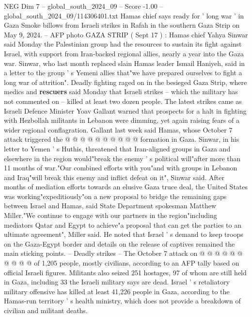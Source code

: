 \begin{textsample}{NEG Dim 7 – global\_south\_2024\_09 – Score -1.00 – global\_south\_2024\_09/114306401.txt}  \label{ex:f7_neg_221}
Hamas chief says ready for ' long war ' in Gaza Smoke billows from Israeli strikes in Rafah in the southern Gaza Strip on May 9, 2024. -- AFP photo GAZA STRIP ( Sept 17 ) : Hamas chief Yahya Sinwar said Monday the Palestinian group had the resources to sustain its fight against Israel, with support from Iran-backed regional allies, nearly a year into the Gaza war.
Sinwar, who last month replaced slain Hamas leader Ismail Haniyeh, said in a letter to the group ' s Yemeni allies that"we have prepared ourselves to fight a long war of attrition".
Deadly fighting raged on in the besieged Gaza Strip, where medics and \textbf{rescuers} said Monday that Israeli strikes -- which the military has not commented on -- killed at least two dozen people.
The latest strikes came as Israeli Defence Minister Yoav Gallant warned that prospects for a halt in fighting with Hezbollah militants in Lebanon were dimming, yet again raising fears of a wider regional conflagration.
Gallant last week said Hamas, whose October 7 attack triggered the @ @ @ @ @ @ @ @ @ @ formation in Gaza.
Sinwar, in his letter to Yemen ' s Huthis, threatened that Iran-aligned groups in Gaza and elsewhere in the region would"break the enemy ' s political will"after more than 11 months of war."Our combined efforts with you"and with groups in Lebanon and Iraq"will break this enemy and inflict defeat on it", Sinwar said.
After months of mediation efforts towards an elusive Gaza truce deal, the United States was working"expeditiously"on a new proposal to bridge the remaining gaps between Israel and Hamas, said State Department spokesman Matthew Miller."We continue to engage with our partners in the region"including mediators Qatar and Egypt to achieve"a proposal that can get the parties to an ultimate agreement", Miller said.
He noted that Israel ' s demand to keep troops on the Gaza-Egypt border and details on the release of captives remained the main sticking points. -- Deadly strikes -- The October 7 attack on @ @ @ @ @ @ @ @ @ @ of 1,205 people, mostly civilians, according to an AFP tally based on official Israeli figures.
Militants also seized 251 hostages, 97 of whom are still held in Gaza, including 33 the Israeli military says are dead.
Israel ' s retaliatory military offensive has killed at least 41,226 people in Gaza, according to the Hamas-run territory ' s health ministry, which does not provide a breakdown of civilian and militant deaths.

\end{textsample}
